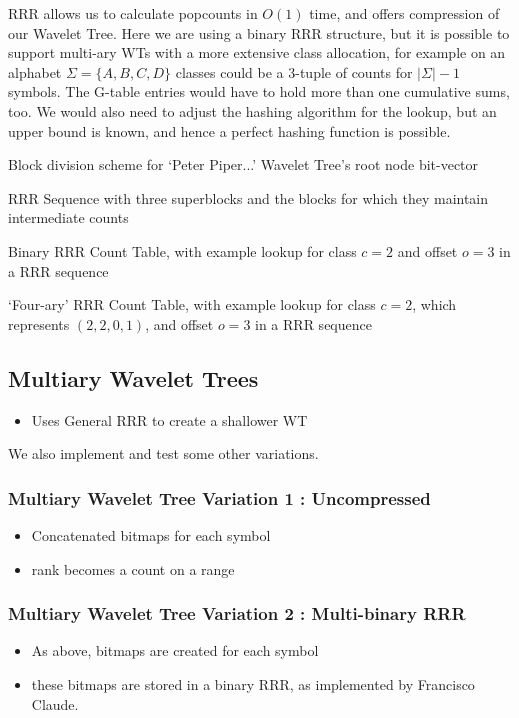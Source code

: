 RRR allows us to calculate popcounts in $O(1)$ time, and offers compression of our Wavelet Tree. Here we are using a binary RRR structure, but it is possible to support multi-ary WTs with a more extensive class allocation, for example on an alphabet $\Sigma = \{ A, B, C, D \}$ classes could be a 3-tuple of counts for $|\Sigma| - 1$ symbols. The G-table entries would have to hold more than one cumulative sums, too. We would also need to adjust the hashing algorithm for the lookup, but an upper bound is known, and hence a perfect hashing function is possible.

			{Block division scheme for `Peter Piper...' Wavelet Tree's root
			node bit-vector}

		{RRR Sequence with three superblocks and the blocks for which they
		maintain intermediate counts}

			{Binary RRR Count Table, with example lookup for class $c = 2$
			and offset $o = 3$ in a RRR sequence}

			{`Four-ary' RRR Count Table, with example lookup for class $c = 2$, 
			which represents $(2, 2, 0, 1)$, and offset $o = 3$ in a RRR
			sequence}
			
\subsection{Multiary Wavelet Trees}
\begin{itemize}
\item
  Uses General RRR to create a shallower WT
\end{itemize}
We also implement and test some other variations.



\subsubsection{Multiary Wavelet Tree Variation 1 : Uncompressed}
\begin{itemize}
\item
  Concatenated bitmaps for each symbol
\item
  rank becomes a count on a range
\end{itemize}



\subsubsection{Multiary Wavelet Tree Variation 2 : Multi-binary RRR}
\begin{itemize}
\item
  As above, bitmaps are created for each symbol
\item
  these bitmaps are stored in a binary RRR, as implemented by
  Francisco Claude.
\end{itemize}